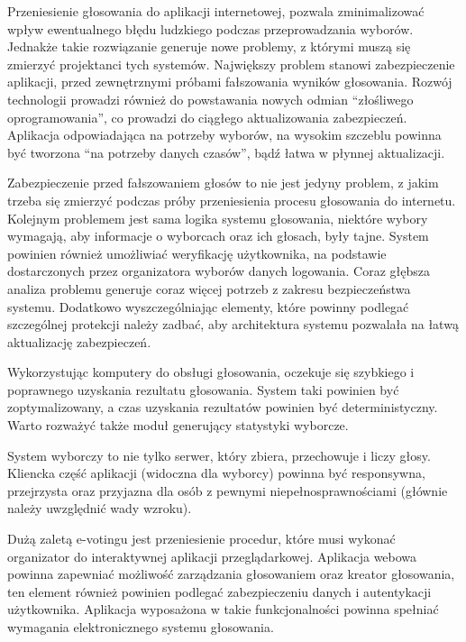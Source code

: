 \documentclass[a4paper,13pt]{report}
\begin{document}
Przeniesienie głosowania do aplikacji internetowej, pozwala zminimalizować wpływ ewentualnego błędu ludzkiego podczas przeprowadzania wyborów. Jednakże takie rozwiązanie generuje nowe problemy, z którymi muszą się zmierzyć projektanci tych systemów. Największy problem stanowi zabezpieczenie aplikacji, przed zewnętrznymi próbami fałszowania wyników głosowania. Rozwój technologii prowadzi również do powstawania nowych odmian “złośliwego oprogramowania”, co prowadzi do ciągłego aktualizowania zabezpieczeń. Aplikacja odpowiadająca na potrzeby wyborów, na wysokim szczeblu powinna być tworzona “na potrzeby danych czasów”, bądź łatwa w płynnej aktualizacji.

Zabezpieczenie przed fałszowaniem głosów to nie jest jedyny problem, z jakim trzeba się zmierzyć podczas próby przeniesienia procesu głosowania do internetu. Kolejnym problemem jest sama logika systemu głosowania, niektóre wybory wymagają, aby informacje o wyborcach oraz ich głosach, były tajne. System powinien również umożliwiać weryfikację użytkownika, na podstawie dostarczonych przez organizatora wyborów danych logowania. Coraz głębsza analiza problemu generuje coraz więcej potrzeb z zakresu bezpieczeństwa systemu. Dodatkowo wyszczególniając elementy, które powinny podlegać szczególnej protekcji należy zadbać, aby architektura systemu pozwalała na łatwą aktualizację zabezpieczeń.

Wykorzystując komputery do obsługi głosowania, oczekuje się szybkiego i poprawnego uzyskania rezultatu głosowania. System taki powinien być zoptymalizowany, a czas uzyskania rezultatów powinien być deterministyczny. Warto rozważyć także moduł generujący statystyki wyborcze.

System wyborczy to nie tylko serwer, który zbiera, przechowuje i liczy głosy. Kliencka część aplikacji (widoczna dla wyborcy) powinna być responsywna, przejrzysta oraz przyjazna dla osób z pewnymi niepełnosprawnościami (głównie należy uwzględnić wady wzroku).

Dużą zaletą e-votingu jest przeniesienie procedur, które musi wykonać organizator do interaktywnej aplikacji przeglądarkowej. Aplikacja webowa powinna zapewniać możliwość zarządzania głosowaniem oraz kreator głosowania, ten element również powinien podlegać zabezpieczeniu danych i autentykacji użytkownika. Aplikacja wyposażona w takie funkcjonalności powinna spełniać wymagania elektronicznego systemu głosowania.
\end{document}
